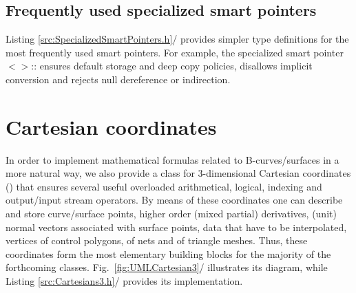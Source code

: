 \documentclass[b5paper, twosided]{book}
\newcommand{\CBlue}[1]{{\color[rgb]{0.0, 0.0, 0.9}{#1}}}
\newcommand{\CPurple}[1]{{\color[rgb]{1.0, 0.0, 0.6}{#1}}}
\DeclareRobustCommand{\mref}[1]{\ref{#1}{\relsize{-1}/\pageref{#1}}}
\begin{document}

\subsection{Frequently used specialized smart pointers}

Listing \mref{src:SpecializedSmartPointers.h} provides simpler type definitions for the most frequently used smart pointers. For example, the specialized smart pointer \CBlue{SP}$<$\CPurple{T}$>$::\CBlue{Default} ensures default storage and deep copy policies, disallows implicit conversion and rejects null dereference or indirection.
 

\section{Cartesian coordinates}

In order to implement mathematical formulas related to B-curves/surfaces in a more natural way, we also provide a class for $3$-dimensional Cartesian coordinates (\CBlue{Cartesian3}) that ensures several useful overloaded arithmetical, logical, indexing and output/input stream operators. By means of these coordinates one can describe and store curve/surface points, higher order (mixed partial) derivatives, (unit) normal vectors associated with surface points, data that have to be interpolated, vertices of control polygons, of nets and of triangle meshes. Thus, these coordinates form the most elementary building blocks for the majority of the forthcoming classes. Fig.\ \mref{fig:UMLCartesian3} illustrates its diagram, while Listing \mref{src:Cartesians3.h} provides its implementation.
\end{document}
